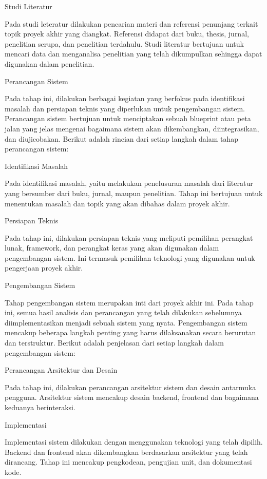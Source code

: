 Studi Literatur

Pada studi leteratur dilakukan pencarian materi dan referensi penunjang terkait topik proyek akhir yang diangkat. Referensi didapat dari buku, thesis, jurnal, penelitian serupa, dan penelitian terdahulu. Studi literatur bertujuan untuk mencari data dan menganalisa penelitian yang telah dikumpulkan sehingga dapat digunakan dalam penelitian.

Perancangan Sistem

Pada tahap ini, dilakukan berbagai kegiatan yang berfokus pada identifikasi masalah dan persiapan teknis yang diperlukan untuk pengembangan sistem. Perancangan sistem bertujuan untuk menciptakan sebuah blueprint atau peta jalan yang jelas mengenai bagaimana sistem akan dikembangkan, diintegrasikan, dan diujicobakan. Berikut adalah rincian dari setiap langkah dalam tahap perancangan sistem:

Identifikasi Masalah

Pada identifikasi masalah, yaitu melakukan penelusuran masalah dari literatur yang bersumber dari buku, jurnal, maupun penelitian. Tahap ini bertujuan untuk menentukan masalah dan topik yang akan dibahas dalam proyek akhir.

Persiapan Teknis

Pada tahap ini, dilakukan persiapan teknis yang meliputi pemilihan perangkat lunak, framework, dan perangkat keras yang akan digunakan dalam pengembangan sistem. Ini termasuk pemilihan teknologi yang digunakan untuk pengerjaan proyek akhir.

Pengembangan Sistem

Tahap pengembangan sistem merupakan inti dari proyek akhir ini. Pada tahap ini, semua hasil analisis dan perancangan yang telah dilakukan sebelumnya diimplementasikan menjadi sebuah sistem yang nyata. Pengembangan sistem mencakup beberapa langkah penting yang harus dilaksanakan secara berurutan dan terstruktur. Berikut adalah penjelasan dari setiap langkah dalam pengembangan sistem:

Perancangan Arsitektur dan Desain

Pada tahap ini, dilakukan perancangan arsitektur sistem dan desain antarmuka pengguna. Arsitektur sistem mencakup desain backend, frontend dan bagaimana keduanya berinteraksi.

Implementasi

Implementasi sistem dilakukan dengan menggunakan teknologi yang telah dipilih. Backend dan frontend akan dikembangkan berdasarkan arsitektur yang telah dirancang. Tahap ini mencakup pengkodean, pengujian unit, dan dokumentasi kode.

